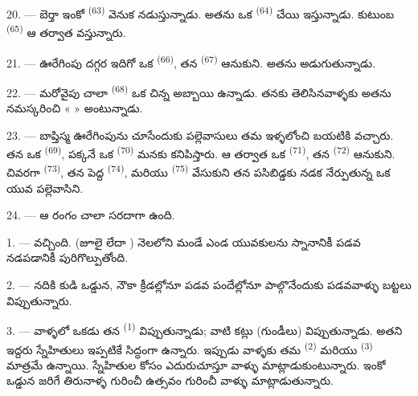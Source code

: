 20. --- బెర్తా ఇంకో  \textsuperscript{(63)} వెనుక నడుస్తున్నాడు. అతను ఒక
 \textsuperscript{(64)} చేయి ఇస్తున్నాడు. కుటుంబ 
\textsuperscript{(65)} ఆ తర్వాత వస్తున్నారు.

\VUsaut{4.6mm}
\VUsaut{3.4mm}

21. --- ఊరేగింపు దగ్గర ఇదిగో ఒక  \textsuperscript{(66)}, తన
 \textsuperscript{(67)} ఆనుకుని. అతను  అడుగుతున్నాడు.

22. --- మరోవైపు చాలా  \textsuperscript{(68)} ఒక చిన్న అబ్బాయి ఉన్నాడు.
తనకు తెలిసినవాళ్ళకు అతను నమస్కరించి «  » అంటున్నాడు.

23. --- బాప్తిస్మ ఊరేగింపును చూసేందుకు పల్లెవాసులు తమ ఇళ్ళలోంచి బయటికి వచ్చారు. తన
 ఒక  \textsuperscript{(69)}, పక్కనే ఒక
 \textsuperscript{(70)} మనకు కనిపిస్తారు. ఆ తర్వాత ఒక 
\textsuperscript{(71)}, తన  \textsuperscript{(72)} ఆనుకుని. చివరగా
 \textsuperscript{(73)}, తన పెద్ద 
\textsuperscript{(74)}, మరియు  \textsuperscript{(75)} వేసుకుని తన
పసిబిడ్డకు నడక నేర్పుతున్న ఒక యువ పల్లెవాసిని.

24. --- ఆ రంగం చాలా సరదాగా ఉంది.

\VUsaut{3.0mm}

\VUsaut{2.4mm}

\VUsaut{3.0mm}

1. ---  వచ్చింది.  (జూలై లేదా ) నెలలోని మండే ఎండ
యువకులను స్నానానికీ పడవ నడపడానికీ పురిగొల్పుతోంది.

2. --- నదికి కుడి ఒడ్డున, నౌకా క్రీడల్లోనూ పడవ పందేల్లోనూ పాల్గొనేందుకు పడవవాళ్ళు బట్టలు
విప్పుతున్నారు.

3. --- వాళ్ళలో ఒకడు తన  \textsuperscript{(1)} విప్పుతున్నాడు; వాటి కట్లు
(గుండీలు) విప్పుతున్నాడు. అతని ఇద్దరు స్నేహితులు ఇప్పటికే సిద్ధంగా ఉన్నారు. ఇప్పుడు వాళ్ళకు తమ
 \textsuperscript{(2)} మరియు  \textsuperscript{(3)}
మాత్రమే ఉన్నాయి. స్నేహితుల కోసం ఎదురుచూస్తూ వాళ్ళు మాట్లాడుకుంటున్నారు. ఇంకో ఒడ్డున జరిగే
తిరునాళ్ళ గురించీ ఉత్సవం గురించీ వాళ్ళు మాట్లాడుతున్నారు.

